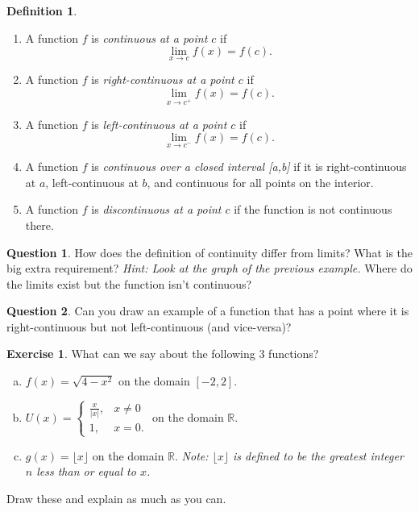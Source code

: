 \documentclass[leqno]{article}
\theoremstyle{definition}
\newtheorem{definition}{Definition}[section]
\newtheorem{question}{Question}[section]
\newtheorem{exercise}{Exercise}[section]
\theoremstyle{remark}
\theoremstyle{theorem}
\newcommand{\R}{\mathbb{R}}
\begin{document}
\begin{definition}~
\begin{enumerate}[1.]
\item A function $f$ is \emph{continuous at a point $c$} if
\[
\lim_{x\to c} f(x) = f(c).
\]

\item A function $f$ is \emph{right-continuous at a point $c$} if
\[
\lim_{x\to c^+} f(x)=f(c).
\]

\item A function $f$ is \emph{left-continuous at a point $c$} if
\[
\lim_{x\to c^-} f(x)=f(c).
\]

\item A function $f$ is \emph{continuous over a closed interval [a,b]} if it is right-continuous at $a$, left-continuous at $b$, and continuous for all points on the interior. 

\item A function $f$ is \emph{discontinuous at a point $c$} if the function is not continuous there.
\end{enumerate}
\end{definition}

\begin{question}
How does the definition of continuity differ from limits? What is the big extra requirement? \emph{Hint: Look at the graph of the previous example.}  Where do the limits exist but the function isn't continuous? 
\vspace*{2cm}
\end{question}

\begin{question}
Can you draw an example of a function that has a point where it is right-continuous but not left-continuous (and vice-versa)?
\vspace*{4cm}
\end{question}

\begin{exercise}
What can we say about the following 3 functions?
\begin{enumerate}[(a)]
\item $f(x)=\sqrt{4-x^2}$ on the domain $[-2,2]$.
\item $U(x)=
\begin{cases}
\frac{x}{|x|}, & x\neq 0\\
1, & x=0.
\end{cases}$ on the domain $\R$.
\item $g(x)=\lfloor x \rfloor$ on the domain $\R$.  \emph{Note: $\lfloor x \rfloor$ is defined to be the greatest integer $n$ less than or equal to $x$.}
\end{enumerate}
Draw these and explain as much as you can.
\vspace*{8cm}
\end{exercise}
\end{document}
